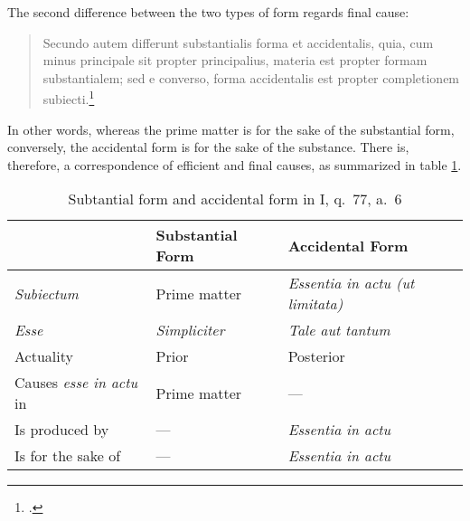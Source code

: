 The second difference between the two types of form regards final cause:
%
\begin{quotation}
Secundo autem differunt substantialis forma et accidentalis, quia, cum minus principale sit propter principalius, materia est propter formam substantialem; sed e converso, forma accidentalis est propter completionem subiecti.\footcite[I, q.~77, a.~6, co.]{st:summa}
\end{quotation}
%
In other words, whereas the prime matter is for the sake of the substantial form, conversely, the accidental form is for the sake of the substance. There is, therefore, a  correspondence of efficient and final causes, as summarized in table \ref{tab:powers-of-soul}.
%
\begin{table}
  \centering
  \begin{OnehalfSpacing}
    \begin{tabular}{lll}
      \toprule
                           & \textbf{Substantial Form} & \textbf{Accidental Form} \\
      \midrule
        \emph{Subiectum}   & Prime matter              & \emph{Essentia in actu (ut limitata)}  \\
        \emph{Esse}        & \emph{Simpliciter}        & \emph{Tale aut tantum}   \\
        Actuality          & Prior                     & Posterior                \\
        Causes \emph{esse in actu} in & Prime matter   & \hspace{6pt}---          \\
        Is produced by     & \hspace{6pt}---           & \emph{Essentia in actu}  \\
        Is for the sake of & \hspace{6pt}---           & \emph{Essentia in actu}  \\
      \bottomrule
    \end{tabular}
  \end{OnehalfSpacing}
  \caption{Subtantial form and accidental form in I, q.~77, a.~6}
  \label{tab:powers-of-soul}
\end{table}
%

